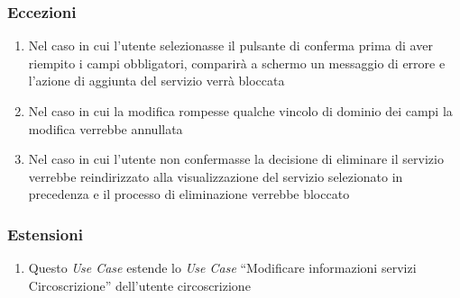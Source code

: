         \subsubsection{Eccezioni}
            \begin{enumerate}
                \item Nel caso in cui l'utente selezionasse il pulsante di conferma prima di aver riempito i campi obbligatori, comparirà a schermo un messaggio di errore e l'azione di aggiunta del servizio verrà bloccata
                \item Nel caso in cui la modifica rompesse qualche vincolo di dominio dei campi la modifica verrebbe annullata
                \item Nel caso in cui l'utente non confermasse la decisione di eliminare il servizio verrebbe reindirizzato alla visualizzazione del servizio selezionato in precedenza e il processo di eliminazione verrebbe bloccato
            \end{enumerate}
        \subsubsection{Estensioni}
            \begin{enumerate}
                \item Questo \textit{Use Case} estende lo \textit{Use Case} ``Modificare informazioni servizi Circoscrizione'' dell'utente circoscrizione
            \end{enumerate}
